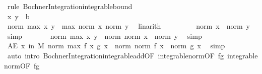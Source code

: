 \begin{isabellebody}
%
\isadelimproof
%
\endisadelimproof
%
\isatagproof
{}\isamarkupfalse%
\ {\isacharparenleft}{\kern0pt}rule\ Bochner{\isacharunderscore}{\kern0pt}Integration{\isachardot}{\kern0pt}integrable{\isacharunderscore}{\kern0pt}bound{\isacharparenright}{\kern0pt}\isanewline
\ \ \isacommand{{\isacharbraceleft}{\kern0pt}}\isamarkupfalse%
\isanewline
\ \ \ \ \isamarkupfalse%
\ x\ y\ {\isacharcolon}{\kern0pt}{\isacharcolon}{\kern0pt}\ {\isacharprime}{\kern0pt}b\ \ \ \ \ \ \ \ \ \ \ \ \ \ \ \ \ \ \ \ \ \ \ \ \ \ \ \ \ \ \ \ \ \ \ \ \ \ \ \ \ \ \ \ \ \isanewline
\ \ \ \ \isamarkupfalse%
\ {\isachardoublequoteopen}norm\ {\isacharparenleft}{\kern0pt}max\ x\ y{\isacharparenright}{\kern0pt}\ {\isasymle}\ max\ {\isacharparenleft}{\kern0pt}norm\ x{\isacharparenright}{\kern0pt}\ {\isacharparenleft}{\kern0pt}norm\ y{\isacharparenright}{\kern0pt}{\isachardoublequoteclose}\ \isamarkupfalse%
\ linarith\isanewline
\ \ \ \ \isamarkupfalse%
\ \isamarkupfalse%
\ {\isachardoublequoteopen}{\isachardot}{\kern0pt}{\isachardot}{\kern0pt}{\isachardot}{\kern0pt}\ {\isasymle}\ norm\ x\ {\isacharplus}{\kern0pt}\ norm\ y{\isachardoublequoteclose}\ \isamarkupfalse%
\ simp\isanewline
\ \ \ \ \isamarkupfalse%
\ \isamarkupfalse%
\ {\isachardoublequoteopen}norm\ {\isacharparenleft}{\kern0pt}max\ x\ y{\isacharparenright}{\kern0pt}\ {\isasymle}\ norm\ {\isacharparenleft}{\kern0pt}norm\ x\ {\isacharplus}{\kern0pt}\ norm\ y{\isacharparenright}{\kern0pt}{\isachardoublequoteclose}\ \isamarkupfalse%
\ simp\isanewline
\ \ \isacommand{{\isacharbraceright}{\kern0pt}}\isamarkupfalse%
\isanewline
\ \ \isamarkupfalse%
\ {\isachardoublequoteopen}AE\ x\ in\ M{\isachardot}{\kern0pt}\ norm\ {\isacharparenleft}{\kern0pt}max\ {\isacharparenleft}{\kern0pt}f\ x{\isacharparenright}{\kern0pt}\ {\isacharparenleft}{\kern0pt}g\ x{\isacharparenright}{\kern0pt}{\isacharparenright}{\kern0pt}\ {\isasymle}\ norm\ {\isacharparenleft}{\kern0pt}norm\ {\isacharparenleft}{\kern0pt}f\ x{\isacharparenright}{\kern0pt}\ {\isacharplus}{\kern0pt}\ norm\ {\isacharparenleft}{\kern0pt}g\ x{\isacharparenright}{\kern0pt}{\isacharparenright}{\kern0pt}{\isachardoublequoteclose}\ \isamarkupfalse%
\ simp\isanewline
{}\isamarkupfalse%
\ {\isacharparenleft}{\kern0pt}auto\ intro{\isacharcolon}{\kern0pt}\ Bochner{\isacharunderscore}{\kern0pt}Integration{\isachardot}{\kern0pt}integrable{\isacharunderscore}{\kern0pt}add{\isacharbrackleft}{\kern0pt}OF\ integrable{\isacharunderscore}{\kern0pt}norm{\isacharbrackleft}{\kern0pt}OF\ fg{\isacharparenleft}{\kern0pt}{}{\isacharparenright}{\kern0pt}{\isacharbrackright}{\kern0pt}\ integrable{\isacharunderscore}{\kern0pt}norm{\isacharbrackleft}{\kern0pt}OF\ fg{\isacharparenleft}{\kern0pt}{}{\isacharparenright}{\kern0pt}{\isacharbrackright}{\kern0pt}{\isacharbrackright}{\kern0pt}{\isacharparenright}{\kern0pt}%

\end{isabellebody}
